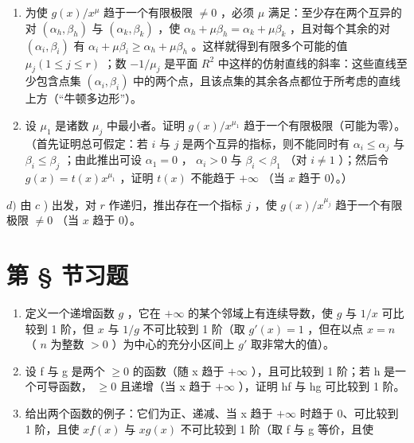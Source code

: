 \begin{enumerate}
\def\labelenumi{\alph{enumi})}
\setcounter{enumi}{1}
\item
  为使 \(g(x)/x^{\mu}\) 趋于一个有限极限 \(\neq0\) ，必须 \(\mu\) 满足：至少存在两个互异的对 \((\alpha_{h},\beta_{h})\) 与 \((\alpha_{k},\beta_{k})\) ，使 \(\alpha_{h}+\mu\beta_{h}=\alpha_{k}+\mu\beta_{k}\) ，且对每个其余的对 \((\alpha_{i},\beta_{i})\) 有 \(\alpha_{i}+\mu\beta_{i}\geqslant\alpha_{h}+\mu\beta_{h}\) 。这样就得到有限多个可能的值 \(\mu_{j}(1\leqslant j\leqslant r)\) ；数 \(-1/\mu_{j}\) 是平面 \(R^{2}\) 中这样的仿射直线的斜率：这些直线至少包含点集 \((\alpha_{i},\beta_{i})\) 中的两个点，且该点集的其余各点都位于所考虑的直线上方（“牛顿多边形”）。
\item
  设 \(\mu_{1}\) 是诸数 \(\mu_{j}\) 中最小者。证明 \(g(x) / x^{\mu_1}\) 趋于一个有限极限（可能为零）。（首先证明总可假定：若 \(i\) 与 \(j\) 是两个互异的指标，则不能同时有 \(\alpha_{i} \leqslant \alpha_{j}\) 与 \(\beta_{i} \leqslant \beta_{j}\) ；由此推出可设 \(\alpha_{1} = 0\) ， \(\alpha_{i} > 0\) 与 \(\beta_{i} < \beta_{1}\) （对 \(i \neq 1\) ）；然后令 \(g(x) = t(x)x^{\mu_1}\) ，证明 \(t(x)\) 不能趋于 \(+\infty\) （当 \(x\) 趋于 0）。）
\end{enumerate}

\(d)\) 由 \(c\) ) 出发，对 \(r\) 作递归，推出存在一个指标 \(j\) ，使 \(g(x) / x^{\mu_j}\) 趋于一个有限极限 \(\neq 0\) （当 \(x\) 趋于 0）。

\setcounter{exercisegroup}{2}
\section*{第 \S{} 节习题}
{}

\begin{enumerate}
\def\labelenumi{\arabic{enumi})}
\item
  定义一个递增函数 \(g\) ，它在 \(+\infty\) 的某个邻域上有连续导数，使 \(g\) 与 \(1 / x\) 可比较到 1 阶，但 \(x\) 与 \(1 / g\) 不可比较到 1 阶（取 \(g'(x) = 1\) ，但在以点 \(x = n\) （ \(n\) 为整数 \(>0\) ）为中心的充分小区间上 \(g'\) 取非常大的值）。
\item
  设 f 与 g 是两个 \(\geqslant0\) 的函数（随 x 趋于 \(+\infty\) ），且可比较到 1 阶；若 h 是一个可导函数， \(\geqslant0\) 且递增（当 x 趋于 \(+\infty\) ），证明 hf 与 hg 可比较到 1 阶。
\item
  给出两个函数的例子：它们为正、递减、当 x 趋于 \(+\infty\) 时趋于 0、可比较到 1 阶，且使 \(xf(x)\) 与 \(xg(x)\) 不可比较到 1 阶（取 f 与 g 等价，且使
\end{enumerate}

